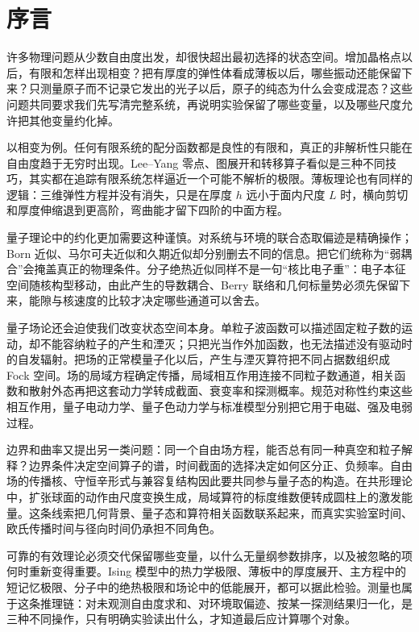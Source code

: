 \chapter*{序言}

许多物理问题从少数自由度出发，却很快超出最初选择的状态空间。增加晶格点以后，有限和怎样出现相变？把有厚度的弹性体看成薄板以后，哪些振动还能保留下来？只测量原子而不记录它发出的光子以后，原子的纯态为什么会变成混态？这些问题共同要求我们先写清完整系统，再说明实验保留了哪些变量，以及哪些尺度允许把其他变量约化掉。

以相变为例。任何有限系统的配分函数都是良性的有限和，真正的非解析性只能在自由度趋于无穷时出现。Lee--Yang 零点、图展开和转移算子看似是三种不同技巧，其实都在追踪有限系统怎样逼近一个可能不解析的极限。薄板理论也有同样的逻辑：三维弹性方程并没有消失，只是在厚度 \(h\) 远小于面内尺度 \(L\) 时，横向剪切和厚度伸缩退到更高阶，弯曲能才留下四阶的中面方程。

量子理论中的约化更加需要这种谨慎。对系统与环境的联合态取偏迹是精确操作；Born 近似、马尔可夫近似和久期近似却分别删去不同的信息。把它们统称为“弱耦合”会掩盖真正的物理条件。分子绝热近似同样不是一句“核比电子重”：电子本征空间随核构型移动，由此产生的导数耦合、Berry 联络和几何标量势必须先保留下来，能隙与核速度的比较才决定哪些通道可以舍去。

量子场论还会迫使我们改变状态空间本身。单粒子波函数可以描述固定粒子数的运动，却不能容纳粒子的产生和湮灭；只把光当作外加函数，也无法描述没有驱动时的自发辐射。把场的正常模量子化以后，产生与湮灭算符把不同占据数组织成 Fock 空间。场的局域方程确定传播，局域相互作用连接不同粒子数通道，相关函数和散射外态再把这套动力学转成截面、衰变率和探测概率。规范对称性约束这些相互作用，量子电动力学、量子色动力学与标准模型分别把它用于电磁、强及电弱过程。

边界和曲率又提出另一类问题：同一个自由场方程，能否总有同一种真空和粒子解释？边界条件决定空间算子的谱，时间截面的选择决定如何区分正、负频率。自由场的传播核、守恒辛形式与兼容复结构因此要共同参与量子态的构造。在共形理论中，扩张球面的动作由尺度变换生成，局域算符的标度维数便转成圆柱上的激发能量。这条线索把几何背景、量子态和算符相关函数联系起来，而真实实验室时间、欧氏传播时间与径向时间仍承担不同角色。

可靠的有效理论必须交代保留哪些变量，以什么无量纲参数排序，以及被忽略的项何时重新变得重要。Ising 模型中的热力学极限、薄板中的厚度展开、主方程中的短记忆极限、分子中的绝热极限和场论中的低能展开，都可以据此检验。测量也属于这条推理链：对未观测自由度求和、对环境取偏迹、按某一探测结果归一化，是三种不同操作，只有明确实验读出什么，才知道最后应计算哪个对象。

